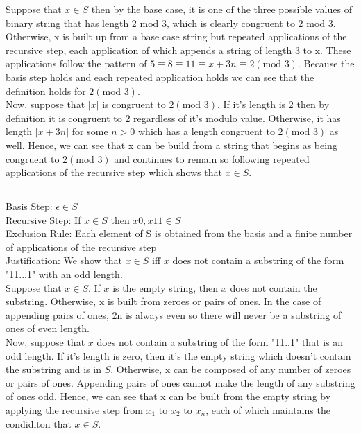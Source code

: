 \documentclass[11pt]{article}
\begin{document}
Suppose that $x \in S$ then by the base case, it is one of the three possible values of binary string that has length 2 mod 3, which is clearly congruent to 2 mod 3. Otherwise, x is built up from a base case string but repeated applications of the recursive step, each application of which appends a string of length 3 to x. These applications follow the pattern of $5 \equiv 8 \equiv 11 \equiv x + 3n \equiv 2 (\text{mod } 3)$. Because the basis step holds and each repeated application holds we can see that the definition holds for $2 (\text{mod } 3)$. \\

Now, suppose that $|x|$ is congruent to $2 (\text{mod } 3)$.  If it's length is 2 then by definition it is congruent to 2 regardless of it's modulo value. Otherwise, it has length $|x + 3n|$ for some $n > 0$ which has a length congruent to $2 (\text{mod } 3)$ as well. Hence, we can see that x can be build from a string that begins as being congruent to $2 (\text{mod } 3)$ and continues to remain so following repeated applications of the recursive step which shows that $x \in S$.

\subsection{} %
Basis Step: $\epsilon \in S$ \\
Recursive Step: If $x \in S$ then $x0, x11 \in S$ \\
Exclusion Rule: Each element of S is obtained from the basis and a finite number of applications of the recursive step\\
Justification: We show that $x \in S$ iff $x$ does not contain a substring of the form "11...1" with an odd length. \\ 

Suppose that $x \in S$. If $x$ is the empty string, then $x$ does not contain the substring. Otherwise, x is built from zeroes or pairs of ones. In the case of appending pairs of ones, 2n is always even so there will never be a substring of ones of even length. \\

Now, suppose that $x$ does not contain a substring of the form "11..1" that is an odd length. If it's length is zero, then it's the empty string which doesn't contain the substring and is in $S$. Otherwise, x can be composed of any number of zeroes or pairs of ones. Appending pairs of ones cannot make the length of any substring of ones odd. Hence, we can see that x can be built from the empty string by applying the recursive step from $x_1$ to $x_2$ to $x_n$, each of which maintains the condiditon that $x \in S$.
\end{document}
